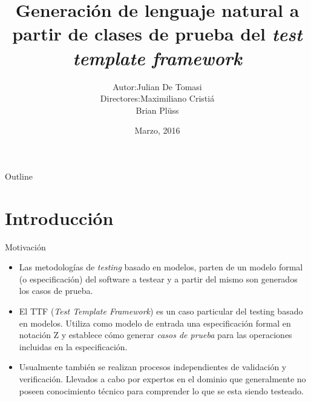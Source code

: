 \documentclass{beamer}
\begin{document}
\title[NLG a partir de clases de prueba del TTF]{Generación de lenguaje natural a partir de clases de prueba del \textit{test template framework}}
\author[Julian De Tomasi]{\begin{tabular}{r@{ }l} 
Autor:      & Julian De Tomasi \\[1ex]
Directores: & Maximiliano Cristiá\\
            & Brian Plüss
\end{tabular}}
\date{Marzo, 2016}

\begin{frame}
  \titlepage
\end{frame}

\begin{frame}{Outline}
  \tableofcontents
\end{frame}

\section{Introducción}

\begin{frame}{Motivación}{}
  \begin{itemize}

  \item {
    Las metodologías de \emph{testing} basado en modelos, parten de un modelo formal (o especificación) del software a testear y a partir del mismo son generados los casos de prueba. 
  }


  \item {
    El TTF (\emph{Test Template Framework}) es un caso particular del testing basado en modelos. Utiliza como modelo de entrada una especificación formal en notación Z y establece cómo generar \emph{casos de prueba} para las operaciones incluidas en la especificación.

  }

  \item {
    Usualmente también se realizan procesos independientes de validación y verificación. Llevados a cabo por expertos en el dominio que generalmente no poseen conocimiento técnico para comprender lo que se esta siendo testeado.
  }


  \end{itemize}
\end{frame}
\end{document}
